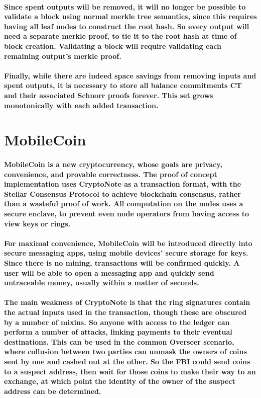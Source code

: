 \documentclass{article}
\begin{document}
\paragraph{Since spent outputs will be removed, it will no longer be possible to validate a block using normal merkle tree semantics, since this requires having all leaf nodes to construct the root hash.  So every output will need a separate merkle proof, to tie it to the root hash at time of block creation.  Validating a block will require validating each remaining output’s merkle proof.}

\paragraph{Finally, while there are indeed space savings from removing inputs and spent outputs, it is necessary to store all balance commitments CT and their associated Schnorr proofs forever.  This set grows monotonically with each added transaction.  }



\section{MobileCoin}

\paragraph{MobileCoin is a new cryptocurrency, whose goals are privacy, convenience, and provable correctness.  The proof of concept implementation uses CryptoNote as a transaction format, with the Stellar Consensus Protocol to achieve blockchain consensus, rather than a wasteful proof of work.  All computation on the nodes uses a secure enclave, to prevent even node operators from having access to view keys or rings.  }

\paragraph{For maximal convenience, MobileCoin will be introduced directly into secure messaging apps, using mobile devices’ secure storage for keys.  Since there is no mining, transactions will be confirmed quickly.  A user will be able to open a messaging app and quickly send untraceable money, usually within a matter of seconds.}

\paragraph{The main weakness of CryptoNote is that the ring signatures contain the actual inputs used in the transaction, though these are obscured by a number of mixins.  So anyone with access to the ledger can perform a number of attacks, linking payments to their eventual destinations.  This can be used in the common Overseer scenario, where collusion between two parties can unmask the owners of coins sent by one and cashed out at the other.  So the FBI could send coins to a suspect address, then wait for those coins to make their way to an exchange, at which point the identity of the owner of the suspect address can be determined.}
\end{document}

